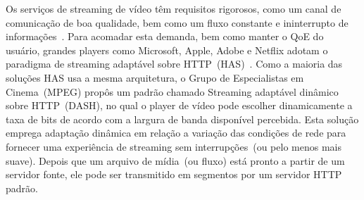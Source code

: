 Os serviços de streaming de vídeo têm requisitos rigorosos, como um canal de comunicação de boa qualidade, bem como um fluxo constante e ininterrupto de informações~\cite{Immich2018WinNet}.
Para acomadar esta demanda, bem como manter o QoE do usuário, grandes players como Microsoft, Apple, Adobe e Netflix adotam o paradigma de streaming adaptável sobre HTTP~(HAS)~\cite{company:dashs}. Como a maioria das soluções HAS usa a mesma arquitetura, o Grupo de Especialistas em Cinema~(MPEG) propôs um padrão chamado Streaming adaptável dinâmico sobre HTTP~(DASH), no qual o player de vídeo pode escolher dinamicamente a taxa de bits de acordo com a largura de banda disponível percebida.
Esta solução emprega adaptação dinâmica em relação a variação das condições de rede para fornecer uma experiência de streaming sem interrupções~(ou pelo menos mais suave). Depois que um arquivo de mídia~(ou fluxo) está pronto a partir de um servidor fonte, ele pode ser transmitido em segmentos por um servidor HTTP padrão.


